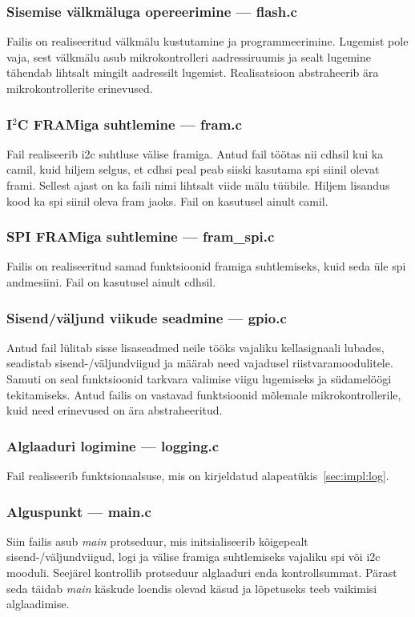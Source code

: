 \documentclass[12pt,a4paper]{article}
\newcommand{\iic}{I${}^2$C}
\begin{document}
\subsubsection{Sisemise välkmäluga opereerimine --- \textbf{flash.c}}
Failis on realiseeritud välkmälu kustutamine ja programmeerimine.
Lugemist pole vaja, sest välkmälu asub mikrokontrolleri aadressiruumis ja sealt
lugemine tähendab lihtsalt mingilt aadressilt lugemist. Realisatsioon
abstraheerib ära mikrokontrollerite erinevused.

\subsubsection{\texorpdfstring{\iic}{I2C} FRAMiga suhtlemine --- \textbf{fram.c}}
Fail realiseerib \gls{i2c} suhtluse välise \gls{fram}iga. Antud fail töötas nii
\gls{cdhs}il kui ka \gls{cam}il, kuid hiljem selgus, et \gls{cdhs}i peal peab
siiski kasutama \gls{spi} siinil olevat \gls{fram}i. Sellest ajast on ka faili
nimi lihtsalt viide mälu tüübile. Hiljem lisandus kood ka \gls{spi} siinil
oleva \gls{fram} jaoks. Fail on kasutusel ainult \gls{cam}il.

\subsubsection{SPI FRAMiga suhtlemine --- \textbf{fram\_spi.c}}
Failis on realiseeritud samad funktsioonid \gls{fram}iga suhtlemiseks, kuid seda
üle \gls{spi} andmesiini. Fail on kasutusel ainult \gls{cdhs}il.

\subsubsection{Sisend/väljund viikude seadmine --- \textbf{gpio.c}}
Antud fail lülitab sisse lisaseadmed neile tööks vajaliku kellasignaali lubades,
seadistab sisend-/väljundviigud ja määrab need vajadusel riistvaramoodulitele.
Samuti on seal funktsioonid tarkvara valimise viigu lugemiseks ja südamelöögi
tekitamiseks. Antud failis on vastavad funktsioonid mõlemale mikrokontrollerile,
kuid need erinevused on ära abstraheeritud.

\subsubsection{Alglaaduri logimine --- \textbf{logging.c}}
Fail realiseerib funktsionaalsuse, mis on kirjeldatud
alapeatükis~\ref{sec:impl:log}.

\subsubsection{Alguspunkt --- \textbf{main.c}}
Siin failis asub \textit{main} protseduur, mis initsialiseerib kõigepealt
sisend-/väljund\-viigud, logi ja välise \gls{fram}iga suhtlemiseks vajaliku
\gls{spi} või \gls{i2c} mooduli. Seejärel kontrollib protseduur alglaaduri enda
kontrollsummat. Pärast seda täidab \textit{main} käskude loendis olevad käsud ja
lõpetuseks teeb vaikimisi alglaadimise.
\end{document}

